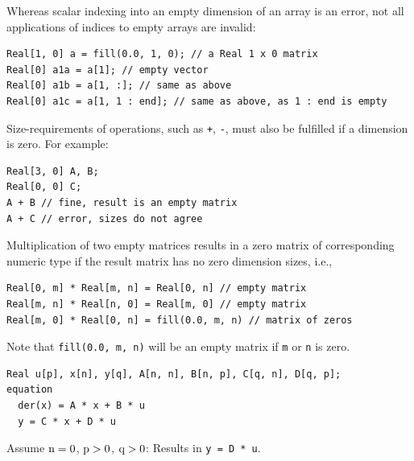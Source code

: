 \begin{example}
Whereas scalar indexing into an empty dimension of an array is an error, not all applications of indices to empty arrays are invalid:
\begin{lstlisting}
Real[1, 0] a = fill(0.0, 1, 0); // a Real 1 x 0 matrix
Real[0] a1a = a[1]; // empty vector
Real[0] a1b = a[1, :]; // same as above
Real[0] a1c = a[1, 1 : end]; // same as above, as 1 : end is empty
\end{lstlisting}
\end{example}

Size-requirements of operations, such as \lstinline!+!, \lstinline!-!, must also be fulfilled if a dimension is zero.
For example:
\begin{lstlisting}[language=modelica]
Real[3, 0] A, B;
Real[0, 0] C;
A + B // fine, result is an empty matrix
A + C // error, sizes do not agree
\end{lstlisting}

Multiplication of two empty matrices results in a zero matrix of corresponding numeric type if the result matrix has no zero dimension sizes, i.e.,
\begin{lstlisting}[language=modelica]
Real[0, m] * Real[m, n] = Real[0, n] // empty matrix
Real[m, n] * Real[n, 0] = Real[m, 0] // empty matrix
Real[m, 0] * Real[0, n] = fill(0.0, m, n) // matrix of zeros
\end{lstlisting}
Note that \lstinline!fill(0.0, m, n)! will be an empty matrix if \lstinline!m! or \lstinline!n! is zero.

\begin{example}
\begin{lstlisting}[language=modelica]
  Real u[p], x[n], y[q], A[n, n], B[n, p], C[q, n], D[q, p];
equation
  der(x) = A * x + B * u
  y = C * x + D * u
\end{lstlisting}
Assume $\text{\lstinline!n!} = 0$, $\text{\lstinline!p!} > 0$, $\text{\lstinline!q!} > 0$: Results in \lstinline!y = D * u!.
\end{example}
